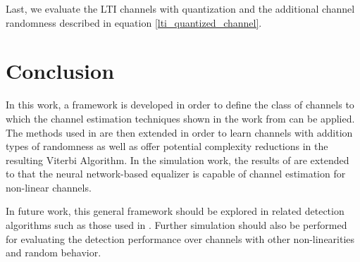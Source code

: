Last, we evaluate the LTI channels with quantization and the additional channel randomness described in equation \eqref{lti_quantized_channel}. 


\section{Conclusion}
In this work, a framework is developed in order to define the class of channels to which the channel estimation techniques shown in the work from \cite{shlezinger2019viterbinet} can be applied. The methods used in \cite{shlezinger2019viterbinet} are then extended in order to learn channels with addition types of randomness as well as offer potential complexity reductions in the resulting Viterbi Algorithm. 
 In the simulation work, the results of \cite{shlezinger2019viterbinet} are extended to that the neural network-based equalizer is capable of channel estimation for  non-linear channels.
 \par 
 In future work, this general framework should be explored in related detection algorithms such as those used in \cite{shlezinger2020datadriven}. Further simulation should also be performed for evaluating the detection performance over channels with other non-linearities and random behavior. 

